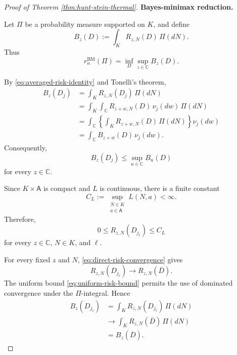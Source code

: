 \documentclass{article}
\theoremstyle{named}
\theoremstyle{named1}
\newcommand{\bbC}{\mathbb C}
\theoremstyle{plain}
\theoremstyle{remark}
\begin{document}
\begin{proof}[Proof of Theorem \ref{thm:hunt-stein-thermal}]
\medskip
\noindent
\textbf{Bayes-minimax reduction.}
\medskip
\noindent

Let \(\Pi\) be a probability measure supported on \(K\), and define
\begin{equation}
    B_z(D)
    :=
    \int_K
        R_{z,N}(D)\,
        \Pi(dN).
    \label{eq:integrated-risk-at-z}
\end{equation}
Thus
\begin{equation}
    r_n^{\mathrm{BM}}(\Pi)
    =
    \inf_D\sup_{z\in\bbC}B_z(D).
    \label{eq:bayes-minimax-integrated-risk}
\end{equation}

By \eqref{eq:averaged-risk-identity} and Tonelli's theorem,
\begin{align}
    B_z(D_j)
    &=
    \int_K
        R_{z,N}(D_j)\,
        \Pi(dN)
    \nonumber\\
    &=
    \int_K
        \int_{\bbC}
            R_{z+w,N}(D)\,
            \nu_j(dw)\,
        \Pi(dN)
    \nonumber\\
    &=
    \int_{\bbC}
        \left\{
            \int_K
                R_{z+w,N}(D)\,
                \Pi(dN)
        \right\}
        \nu_j(dw)
    \nonumber\\
    &=
    \int_{\bbC}
        B_{z+w}(D)\,
        \nu_j(dw).
    \label{eq:averaged-integrated-risk}
\end{align}
Consequently,
\begin{equation}
    B_z(D_j)
    \leq
    \sup_{u\in\bbC}B_u(D)
    \label{eq:averaged-integrated-risk-bound}
\end{equation}
for every \(z\in\bbC\).

Since \(K\times\mathsf A\) is compact and \(L\) is continuous, there is a
finite constant
\begin{equation}
    C_L
    :=
    \sup_{\substack{N\in K\\a\in\mathsf A}}
    L(N,a)
    <
    \infty.
    \label{eq:uniform-loss-bound}
\end{equation}
Therefore,
\begin{equation}
    0
    \leq
    R_{z,N}(D_{j_\ell})
    \leq
    C_L
    \label{eq:uniform-risk-bound}
\end{equation}
for every \(z\in\bbC\), \(N\in K\), and \(\ell\).

For every fixed \(z\) and \(N\),
\eqref{eq:direct-risk-convergence} gives
\[
    R_{z,N}(D_{j_\ell})
    \rightarrow
    R_{z,N}(\overline D).
\]
The uniform bound \eqref{eq:uniform-risk-bound} permits the use of dominated
convergence under the \(\Pi\)-integral. Hence
\begin{align}
    B_z(D_{j_\ell})
    &=
    \int_K
        R_{z,N}(D_{j_\ell})\,
        \Pi(dN)
    \nonumber\\
    &\rightarrow
    \int_K
        R_{z,N}(\overline D)\,
        \Pi(dN)
    \nonumber\\
    &=
    B_z(\overline D).
    \label{eq:integrated-risk-convergence}
\end{align}


\end{proof}
\end{document}

